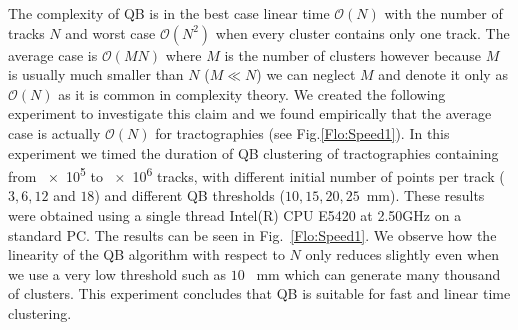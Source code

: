 \documentclass{bioinfo}
\begin{document}
The complexity of QB is in the best case linear time $\mathcal{O}(N)$
with the number of tracks $N$ and worst case $\mathcal{O}(N^{2})$ when
every cluster contains only one track. The average case is
$\mathcal{O}(MN)$ where $M$ is the number of clusters however because
$M$ is usually much smaller than $N$ ($M\ll N$) we can neglect $M$ and
denote it only as $\mathcal{O}(N)$ as it is common in complexity
theory. We created the following experiment to investigate this claim
and we found empirically that the average case is actually
$\mathcal{O}(N)$ for tractographies (see Fig.\ref{Flo:Speed1}).  In this
experiment we timed the duration of QB clustering of tractographies
containing from \num{e5} to \num{e6} tracks, with different initial
number of points per track ($3,6,12$ and $18$) and different QB
thresholds ($10,15,20,25$~mm). These results were obtained using
a single thread Intel(R) CPU E5420 at 2.50GHz on a standard
PC. The results can be seen in Fig.~\ref{Flo:Speed1}. We observe how the
linearity of the QB algorithm with respect to $N$ only reduces slightly
even when we use a very low threshold such as $10$ ~mm which can
generate many thousand of clusters. This experiment concludes that QB is
suitable for fast and linear time clustering.
\end{document}
